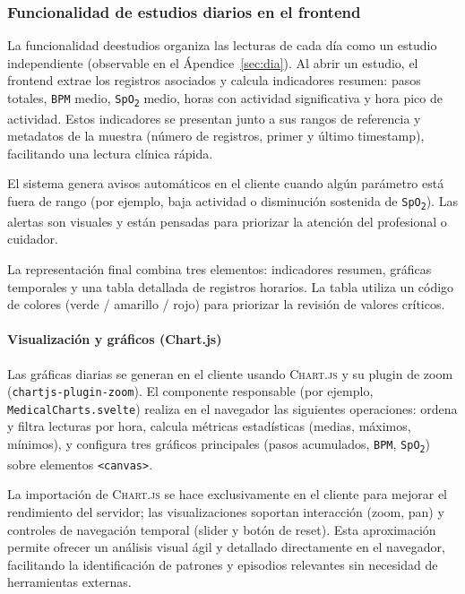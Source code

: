 \documentclass[12pt, a4paper]{article}
\begin{document}
\subsubsection{Funcionalidad de estudios diarios en el frontend}

La funcionalidad deestudios organiza las lecturas de cada día como un estudio independiente (observable en el Ápendice~\ref{sec:dia}). Al abrir un estudio, el frontend extrae los registros asociados y calcula indicadores resumen: pasos totales, \texttt{BPM} medio, \texttt{SpO\textsubscript{2}} medio, horas con actividad significativa y hora pico de actividad. Estos indicadores se presentan junto a sus rangos de referencia y metadatos de la muestra (número de registros, primer y último timestamp), facilitando una lectura clínica rápida.  

El sistema genera avisos automáticos en el cliente cuando algún parámetro está fuera de rango (por ejemplo, baja actividad o disminución sostenida de \texttt{SpO\textsubscript{2}}). Las alertas son visuales y están pensadas para priorizar la atención del profesional o cuidador.

La representación final combina tres elementos: indicadores resumen, gráficas temporales y una tabla detallada de registros horarios. La tabla utiliza un código de colores (verde / amarillo / rojo) para priorizar la revisión de valores críticos.

\paragraph{Visualización y gráficos (Chart.js)}  
Las gráficas diarias se generan en el cliente usando \textsc{Chart.js} y su plugin de zoom (\texttt{chartjs-plugin-zoom}). El componente responsable (por ejemplo, \texttt{MedicalCharts.svelte}) realiza en el navegador las siguientes operaciones: ordena y filtra lecturas por hora, calcula métricas estadísticas (medias, máximos, mínimos), y configura tres gráficos principales (pasos acumulados, \texttt{BPM}, \texttt{SpO\textsubscript{2}}) sobre elementos \texttt{<canvas>}.  

La importación de \textsc{Chart.js} se hace exclusivamente en el cliente para mejorar el rendimiento del servidor; las visualizaciones soportan interacción (zoom, pan) y controles de navegación temporal (slider y botón de reset). Esta aproximación permite ofrecer un análisis visual ágil y detallado directamente en el navegador, facilitando la identificación de patrones y episodios relevantes sin necesidad de herramientas externas.
\end{document}
